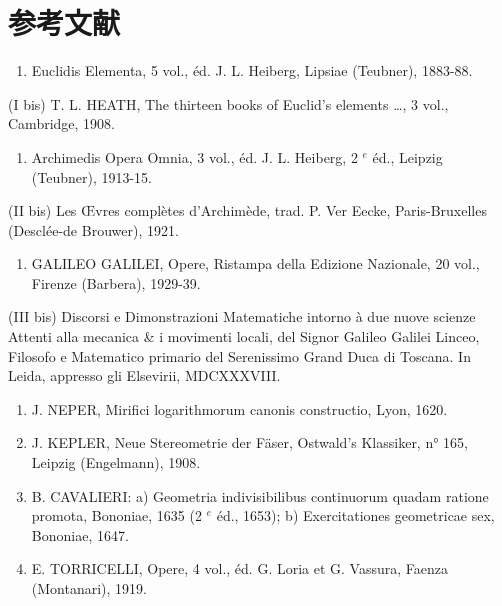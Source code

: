 \section*{参考文献}
{}

\begin{enumerate}
\def\labelenumi{(\Roman{enumi})}
\tightlist
\item
  Euclidis Elementa, 5 vol., éd. J. L. Heiberg, Lipsiae (Teubner), 1883-88.
\end{enumerate}

(I bis) T. L. HEATH, The thirteen books of Euclid's elements \ldots, 3 vol., Cambridge, 1908.

\begin{enumerate}
\def\labelenumi{(\Roman{enumi})}
\setcounter{enumi}{1}
\tightlist
\item
  Archimedis Opera Omnia, 3 vol., éd. J. L. Heiberg, 2 \(^{e}\) éd., Leipzig (Teubner), 1913-15.
\end{enumerate}

(II bis) Les Œvres complètes d'Archimède, trad. P. Ver Eecke, Paris-Bruxelles (Desclée-de Brouwer), 1921.

\begin{enumerate}
\def\labelenumi{(\Roman{enumi})}
\setcounter{enumi}{2}
\tightlist
\item
  GALILEO GALILEI, Opere, Ristampa della Edizione Nazionale, 20 vol., Firenze (Barbera), 1929-39.
\end{enumerate}

(III bis) Discorsi e Dimonstrazioni Matematiche intorno à due nuove scienze Attenti alla mecanica \& i movimenti locali, del Signor Galileo Galilei Linceo, Filosofo e Matematico primario del Serenissimo Grand Duca di Toscana. In Leida, appresso gli Elsevirii, MDCXXXVIII.

\begin{enumerate}
\def\labelenumi{(\Roman{enumi})}
\setcounter{enumi}{3}
\item
  J. NEPER, Mirifici logarithmorum canonis constructio, Lyon, 1620.
\item
  J. KEPLER, Neue Stereometrie der Fäser, Ostwald's Klassiker, n° 165, Leipzig (Engelmann), 1908.
\item
  B. CAVALIERI: a) Geometria indivisibilibus continuorum quadam ratione promota, Bononiae, 1635 (2 \(^{e}\) éd., 1653); b) Exercitationes geometricae sex, Bononiae, 1647.
\item
  E. TORRICELLI, Opere, 4 vol., éd. G. Loria et G. Vassura, Faenza (Montanari), 1919.
\end{enumerate}

